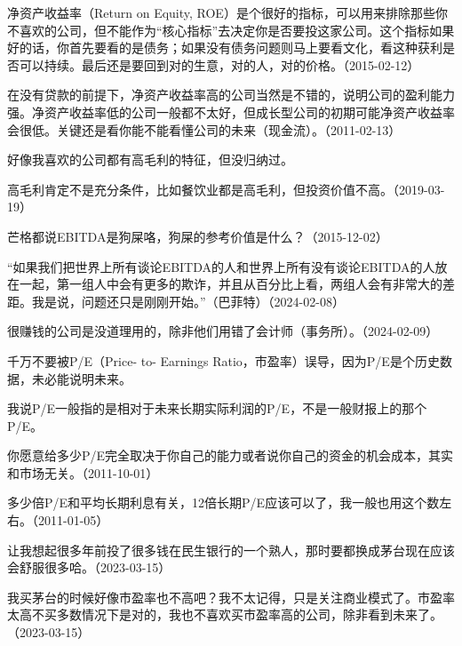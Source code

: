 净资产收益率（Return on Equity, ROE）是个很好的指标，可以用来排除那些你不喜欢的公司，但不能作为“核心指标”去决定你是否要投这家公司。这个指标如果好的话，你首先要看的是债务；如果没有债务问题则马上要看文化，看这种获利是否可以持续。最后还是要回到对的生意，对的人，对的价格。（2015-02-12）

在没有贷款的前提下，净资产收益率高的公司当然是不错的，说明公司的盈利能力强。净资产收益率低的公司一般都不太好，但成长型公司的初期可能净资产收益率会很低。关键还是看你能不能看懂公司的未来（现金流）。（2011-02-13）


好像我喜欢的公司都有高毛利的特征，但没归纳过。

高毛利肯定不是充分条件，比如餐饮业都是高毛利，但投资价值不高。（2019-03-19）


芒格都说EBITDA是狗屎咯，狗屎的参考价值是什么？（2015-12-02）

“如果我们把世界上所有谈论EBITDA的人和世界上所有没有谈论EBITDA的人放在一起，第一组人中会有更多的欺诈，并且从百分比上看，两组人会有非常大的差距。我是说，问题还只是刚刚开始。”（巴菲特）（2024-02-08）

很赚钱的公司是没道理用的，除非他们用错了会计师（事务所）。（2024-02-09）

千万不要被P/E（Price- to- Earnings Ratio，市盈率）误导，因为P/E是个历史数据，未必能说明未来。

我说P/E一般指的是相对于未来长期实际利润的P/E，不是一般财报上的那个P/E。

你愿意给多少P/E完全取决于你自己的能力或者说你自己的资金的机会成本，其实和市场无关。（2011-10-01）

多少倍P/E和平均长期利息有关，12倍长期P/E应该可以了，我一般也用这个数左右。（2011-01-05）


让我想起很多年前投了很多钱在民生银行的一个熟人，那时要都换成茅台现在应该会舒服很多哈。（2023-03-15）


我买茅台的时候好像市盈率也不高吧？我不太记得，只是关注商业模式了。市盈率太高不买多数情况下是对的，我也不喜欢买市盈率高的公司，除非看到未来了。（2023-03-15）

